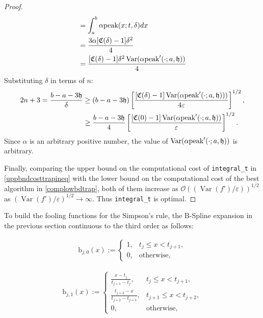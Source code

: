 \documentclass{iitthesis}
\DeclareMathOperator{\Var}{Var}
\theoremstyle{definition}
\theoremstyle{remark}
\begin{document}
\begin{proof}
\begin{subequations}
\begin{align*}
     &=\int_{a}^{b}\alpha\textup{peak}(x;t,\delta)dx\\
     &=\frac{3\alpha[\mathfrak{C}(\delta)-1]\delta^2}{4}\\
     &=\frac{[\mathfrak{C}(\delta)-1]\delta^2\Var(\alpha\textup{peak}'(\cdot;a,\mathfrak{h}))}{4}
  \end{align*}
  \end{subequations}
  Substituting $\delta$  in terms of $n$:
      \begin{align*}
        2n+3=\frac{b-a-3\mathfrak{h}}{\delta}&\ge(b-a-3\mathfrak{h})\left[\frac{[\mathfrak{C}(\delta)-1]\Var(\alpha \textup{peak}'(\cdot;a,\mathfrak{h})))}{4\varepsilon}\right]^{1/2},\\
        &\ge\frac{b-a-3\mathfrak{h}}{4}\left[\frac{[\mathfrak{C}(0)-1]\Var(\alpha \textup{peak}'(\cdot;a,\mathfrak{h}))}{\varepsilon}\right]^{1/2}.
    \end{align*}
    Since $\alpha$ is an arbitrary positive number, the value of $\Var(\alpha \textup{peak}'(\cdot;a,\mathfrak{h}))$ is arbitrary.

    Finally, comparing the upper bound on the computational cost of {\tt integral\_t} in \eqref{uppbndcosttrapineq} with the lower bound on the computational cost of the best algorithm in \eqref{complowbdtrap}, both of them increase as $\mathcal{O}((\Var(f')/\varepsilon))^{1/2}$ as $(\Var(f')/\varepsilon)^{1/2}\rightarrow \infty$. Thus {\tt integral\_t} is optimal.
\end{proof}


To build the fooling functions for the Simpson's rule, the B-Spline expansion in the previous section continuous to the third order as follows:

\begin{align*}
  \text{b}_{j,0}(x):= \begin{cases} \displaystyle 1, & t_{j} \le x < t_{j+1},\\[1ex]
\displaystyle  0, & \text{otherwise},
\end{cases}
\end{align*}

\begin{align*}
  \text{b}_{j,1}(x):= \begin{cases} \displaystyle \frac{x-t_{j}}{t_{j+1}-t_{j}}, & t_{j} \le x < t_{j+1},\\[1ex]
\displaystyle \frac{t_{j+2}-x}{t_{j+2}-t_{j+1}}, & t_{j+1} \le x < t_{j+2},\\[1ex]
\displaystyle  0, & \text{otherwise},
\end{cases}
\end{align*}
\end{document}
